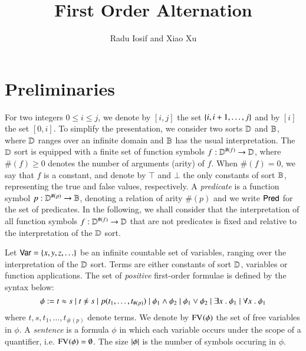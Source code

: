 \documentclass{llncs}
\begin{document}

\title{First Order Alternation}

\author{Radu Iosif and Xiao Xu}

\maketitle

\begin{abstract}
\end{abstract}

\section{Preliminaries}

For two integers $0 \leq i \leq j$, we denote by $[i,j]$ the set
$\{ i,i+1,\ldots,j \}$ and by $[i]$ the set $[0,i]$. To simplify the
presentation, we consider two sorts $\mathbb{D}$ and $\mathbb{B}$, where $\mathbb{D}$
ranges over an infinite domain and $\mathbb{B}$ has the usual
interpretation. The $\mathbb{D}$ sort is equipped with a finite set of
function symbols $f : \mathbb{D}^{\#(f)} \rightarrow \mathbb{D}$, where
$\#(f)\geq0$ denotes the number of arguments (arity) of $f$. When
$\#(f)=0$, we say that $f$ is a constant, and denote by $\top$ and
$\bot$ the only constants of sort $\mathbb{B}$, representing the true and
false values, respectively. A \emph{predicate} is a function symbol $p
: \mathbb{D}^{\#(p)} \rightarrow \mathbb{B}$, denoting a relation of arity
$\#(p)$ and we write $\mathsf{Pred}$ for the set of predicates. In the
following, we shall consider that the interpretation of all function
symbols $f : \mathbb{D}^{\#(f)} \rightarrow \mathbb{D}$ that are not predicates
is fixed and relative to the interpretation of the $\mathbb{D}$ sort.

Let $\mathsf{Var} = \{ x,y,z,\ldots \}$ be an infinite countable set of
variables, ranging over the interpretation of the $\mathbb{D}$ sort. Terms
are either constants of sort $\mathbb{D}$, variables or function
applications. The set of \emph{positive} first-order formulae is
defined by the syntax below:
\[\phi := t \teq s \mid t \not\teq s \mid p(t_1,\ldots,t_{\#(p)}) 
\mid \phi_1 \wedge \phi_2 \mid \phi_1 \vee \phi_2 \mid \exists x ~.~
\phi_1 \mid \forall x ~.~ \phi_1\] where $t,s,t_1,\ldots,t_{\#(p)}$
denote terms. We denote by $\mathrm{FV}_{}(\phi)$ the set of free variables in
$\phi$. A \emph{sentence} is a formula $\phi$ in which each variable
occurs under the scope of a quantifier, i.e. $\mathrm{FV}_{}(\phi) =
\emptyset$. The size ${|{\phi}|}$ is the number of symbols occuring in
$\phi$. 
\end{document}
